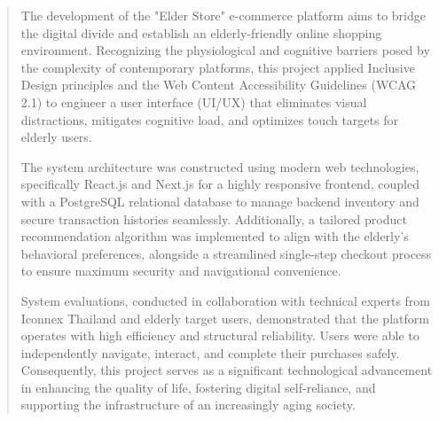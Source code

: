 \begin{abstract}
\par
The development of the "Elder Store" e-commerce platform aims to bridge the digital divide and establish an elderly-friendly online shopping environment. Recognizing the physiological and cognitive barriers posed by the complexity of contemporary platforms, this project applied Inclusive Design principles and the Web Content Accessibility Guidelines (WCAG 2.1) to engineer a user interface (UI/UX) that eliminates visual distractions, mitigates cognitive load, and optimizes touch targets for elderly users.

\par
The system architecture was constructed using modern web technologies, specifically React.js and Next.js for a highly responsive frontend, coupled with a PostgreSQL relational database to manage backend inventory and secure transaction histories seamlessly. Additionally, a tailored product recommendation algorithm was implemented to align with the elderly's behavioral preferences, alongside a streamlined single-step checkout process to ensure maximum security and navigational convenience.

\par
System evaluations, conducted in collaboration with technical experts from Iconnex Thailand and elderly target users, demonstrated that the platform operates with high efficiency and structural reliability. Users were able to independently navigate, interact, and complete their purchases safely. Consequently, this project serves as a significant technological advancement in enhancing the quality of life, fostering digital self-reliance, and supporting the infrastructure of an increasingly aging society.
\end{abstract}

%


